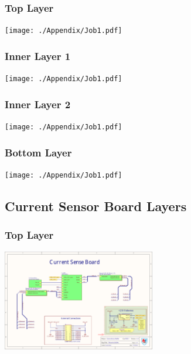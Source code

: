 \subsubsection{Top Layer}
\begin{center}
	\texttt{[image: ./Appendix/Job1.pdf]}
\end{center}
\subsubsection{Inner Layer 1}
\begin{center}
	\texttt{[image: ./Appendix/Job1.pdf]}
\end{center}
\subsubsection{Inner Layer 2}
\begin{center}
	\texttt{[image: ./Appendix/Job1.pdf]}
\end{center}
\subsubsection{Bottom Layer}
\begin{center}
	\texttt{[image: ./Appendix/Job1.pdf]}
\end{center}

\def\excerpt{\subsection{Current Sensor Board Schematic}\label{section:current_sensor_files}}


\subsection{Current Sensor Board Layers}
\subsubsection{Top Layer}
\begin{center}
	\includegraphics[page=6,width=0.5\textwidth,angle=90,origin=c]{./Appendix/Job2.pdf}
\end{center}

